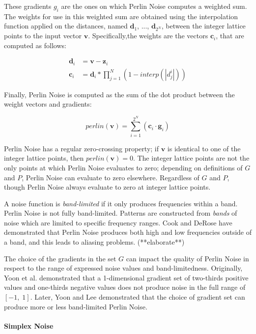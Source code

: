 \documentclass[12pt]{article}
\theoremstyle{definition}
\theoremstyle{remark}
\begin{document}
These gradients $g_i$ are the ones on which Perlin Noise computes a weighted sum. The weights for use in this weighted sum are obtained using the interpolation function applied on the distances, named $\textbf{d}_1$, ..., $\textbf{d}_{2^N}$, between the integer lattice points to the input vector $\textbf{v}$. Specifically,the weights are the vectors $\textbf{c}_i$, that are computed as follows:

\begin{align*}
	\textbf{d}_i &= \textbf{v} - \textbf{z}_i\\
	\textbf{c}_i &= \textbf{d}_i * \prod_{j=1}^{N}(1-interp(|d^i_j|))
\end{align*}

Finally, Perlin Noise is computed as the sum of the dot product between the weight vectors and gradients:

\begin{equation*}
	perlin(\textbf{v}) = \sum_{i=1}^{2^N}(\textbf{c}_i \cdot \textbf{g}_i)
\end{equation*}

Perlin Noise has a regular zero-crossing property; if $\textbf{v}$ is identical to one of the integer lattice points, then $perlin(\textbf{v})=0$. The integer lattice points are not the only points at which Perlin Noise evaluates to zero; depending on definitions of $G$ and $P$, Perlin Noise can evaluate to zero elsewhere. Regardless of $G$ and $P$, though Perlin Noise always evaluate to zero at integer lattice points.

A noise function is \textit{band-limited} if it only produces frequencies within a band. Perlin Noise is not fully band-limited\cite{cookderose2005}. Patterns are constructed from \textit{bands} of noise which are limited to specific frequency ranges. Cook and DeRose have demonstrated that Perlin Noise produces both high and low frequencies outside of a band, and this leads to aliasing problems. (**elaborate**)

The choice of the gradients in the set $G$ can impact the quality of Perlin Noise in respect to the range of expressed noise values and band-limitedness. Originally,  Yoon et al.\cite{yoonetal2004} demonstrated that a 1-dimensional gradient set of two-thirds positive values and one-thirds negative values does not produce noise in the full range of $[-1, \; 1]$. Later, Yoon and Lee\cite{yoonlee2008} demonstrated that the choice of gradient set can produce more or less band-limited Perlin Noise.

\paragraph{Simplex Noise}
\end{document}
